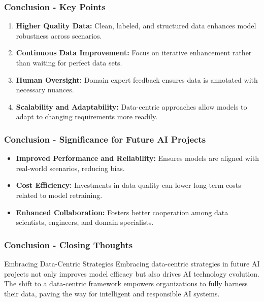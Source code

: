 \documentclass[aspectratio=169]{beamer}
\begin{document}
\begin{frame}[fragile]
    \frametitle{Conclusion - Key Points}
    \begin{enumerate}
        \item \textbf{Higher Quality Data:} Clean, labeled, and structured data enhances model robustness across scenarios.
        \item \textbf{Continuous Data Improvement:} Focus on iterative enhancement rather than waiting for perfect data sets.
        \item \textbf{Human Oversight:} Domain expert feedback ensures data is annotated with necessary nuances.
        \item \textbf{Scalability and Adaptability:} Data-centric approaches allow models to adapt to changing requirements more readily.
    \end{enumerate}
\end{frame}

\begin{frame}[fragile]
    \frametitle{Conclusion - Significance for Future AI Projects}
    \begin{itemize}
        \item \textbf{Improved Performance and Reliability:} Ensures models are aligned with real-world scenarios, reducing bias.
        \item \textbf{Cost Efficiency:} Investments in data quality can lower long-term costs related to model retraining.
        \item \textbf{Enhanced Collaboration:} Fosters better cooperation among data scientists, engineers, and domain specialists.
    \end{itemize}
\end{frame}

\begin{frame}[fragile]
    \frametitle{Conclusion - Closing Thoughts}
    \begin{block}{Embracing Data-Centric Strategies}
        Embracing data-centric strategies in future AI projects not only improves model efficacy but also drives AI technology evolution. The shift to a data-centric framework empowers organizations to fully harness their data, paving the way for intelligent and responsible AI systems.
    \end{block}
\end{frame}
\end{document}
